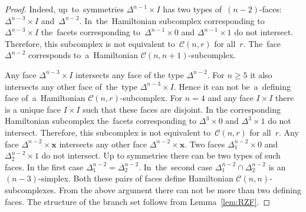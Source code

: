 \documentclass[12pt]{amsart}
\theoremstyle{definition}
\theoremstyle{remark}
\begin{document}
\begin{proof}
Indeed, up~to~symmetries $\Delta^{n-1}\times I$ has two types of~$(n-2)$-faces:
$\Delta^{n-3}\times I$ and~$\Delta^{n-2}$. In~the~Hamiltonian subcomplex corresponding
to~$\Delta^{n-3}\times I$ the~facets corresponding to~$\Delta^{n-1}\times 0$ and $\Delta^{n-1}\times 1$
do not intersect. Therefore, this subcomplex is not equivalent to~$\mathcal{C}(n,r)$ for all~$r$.
The~face $\Delta^{n-2}$ corresponds to~a~Hamiltonian $\mathcal{C}(n,n+1)$-subcomplex.  

Any face $\Delta^{n-3}\times I$ intersects any face of the type $\Delta^{n-2}$. For $n\geqslant 5$
it also intersects any other face of~the~type $\Delta^{n-3}\times I$. Hence it can not be~a~defining face
of~a~Hamiltonian $\mathcal{C}(n,r)$-subcomplex. For $n=4$ and any face $I\times I$ there is a unique face $I\times I$ 
such that these faces are disjoint. In the corresponding Hamiltonian subcomplex the~facets corresponding
to $\Delta^3\times 0$ and $\Delta^3\times 1$ do not intersect. 
Therefore, this subcomplex is not equivalent to~$\mathcal{C}(n,r)$ for all~$r$.
Any face $\Delta^{n-2}\times \boldsymbol{x}$ intersects any other face $\Delta^{n-2}\times \boldsymbol{x}$.
Two faces $\Delta^{n-2}_1\times 0$ and $\Delta^{n-2}_2\times 1$ do not intersect. 
Up to symmetries there can be two types of such faces. In the first case $\Delta^{n-2}_1=\Delta^{n-2}_2$.
In~the~second case $\Delta^{n-2}_1\cap\Delta^{n-2}_2$ is an~$(n-3)$-simplex. Both these pairs of faces 
define Hamiltonian $\mathcal{C}(n,n)$-subcomplexes.  From the above argument there can not
be more than two defining faces. The structure of the branch set follows from Lemma~\ref{lem:RZF}.
\end{proof}
\end{document}
